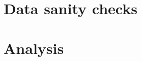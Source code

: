 \documentclass{article}
\begin{document}
\section{Data sanity checks}\label{sec:methods}


% 

\section{Analysis}

\end{document}
